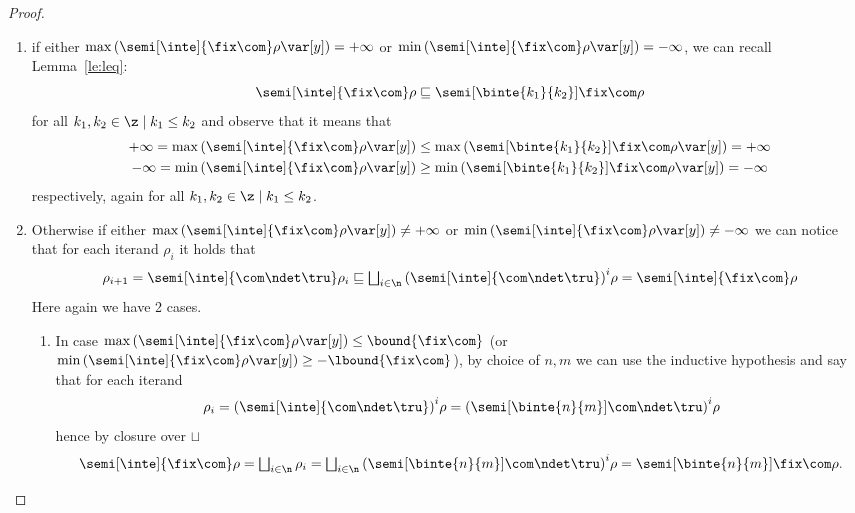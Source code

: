 \begin{proof}
  \begin{enumerate}[label=(\roman*)]
  \item if either
    \({\max\left(\semi[\inte]{\fix\com}\rho\var[y]\right) = +\infty}\)
    or
    \({\min\left(\semi[\inte]{\fix\com}\rho\var[y]\right) =
      -\infty}\), we can recall Lemma~\ref{le:leq}:
    \begin{equation*}
      \semi[\inte]{\fix\com}\rho \sqsubseteq \semi[\binte{k_1}{k_2}]{\fix\com}\rho
    \end{equation*}
    for all \(k_1,k_2 \in \z \mid k_1 \leq k_2\) and observe that it
    means that
    \begin{align*}
      +\infty = \max\left(\semi[\inte]{\fix\com}\rho\var[y]\right) & \leq \max\left(\semi[\binte{k_1}{k_2}]{\fix\com}\rho\var[y]\right) = +\infty \\
      -\infty = \min\left(\semi[\inte]{\fix\com}\rho\var[y]\right) & \geq \min\left(\semi[\binte{k_1}{k_2}]{\fix\com}\rho\var[y]\right) = -\infty
    \end{align*}
    respectively, again for all \(k_1,k_2 \in \z \mid k_1 \leq
    k_2\).
  \item Otherwise if either
    \({\max\left(\semi[\inte]{\fix\com}\rho\var[y]\right) \neq
      +\infty}\) or
    \({\min\left(\semi[\inte]{\fix\com}\rho\var[y]\right) \neq
      -\infty}\) we can notice that for each iterand
    \(\rho_i\) it holds that
    \begin{equation*}
      \rho_{i+1} = \semi[\inte]{\com \ndet \tru}\rho_i
      \sqsubseteq
      \textstyle\bigsqcup_{i\in\n} {\left(\semi[\inte]{\com \ndet \tru}\right)}^i\rho
      =
      \semi[\inte]{\fix\com}\rho
    \end{equation*}
    Here again we have 2 cases.
    \begin{enumerate}[label=(\alph*)]
    \item In case
      \(\max\left(\semi[\inte]{\fix\com}\rho\var[y]\right) \leq
      \bound{\fix\com}\) (or
      \(\min\left(\semi[\inte]{\fix\com}\rho\var[y]\right) \geq
      -\lbound{\fix\com}\)), by choice of \(n,m\) we can use the
      inductive hypothesis and say that for each iterand
      \begin{equation*}
        \rho_i = {\left(\semi[\inte]{\com\ndet\tru}\right)}^i\rho = {\left(\semi[\binte{n}{m}]{\com\ndet\tru}\right)}^i\rho
      \end{equation*}
      hence by closure over \(\sqcup\)
      \begin{equation*}
        \semi[\inte]{\fix\com}\rho
        =
        \textstyle\bigsqcup_{i\in\n}\rho_i
        =
        \textstyle\bigsqcup_{i\in\n}{\left(\semi[\binte{n}{m}]{\com\ndet\tru}\right)}^i\rho
        =
        \semi[\binte{n}{m}]{\fix\com}\rho.
      \end{equation*}
      

\end{enumerate}
\end{enumerate}
\end{proof}
